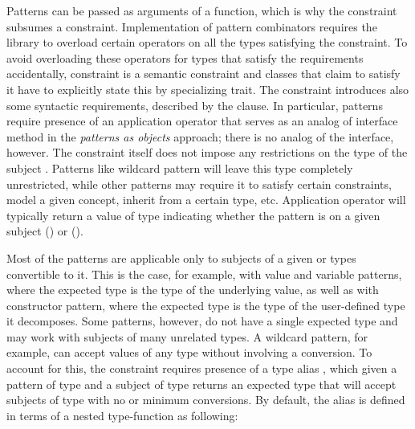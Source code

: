 Patterns can be passed as arguments of a function, which is why the constraint subsumes a
 constraint. Implementation of pattern combinators requires the 
library to overload certain operators on all the types satisfying the 
constraint. To avoid overloading these operators for types that satisfy the 
requirements accidentally,  constraint is a semantic constraint 
and classes that claim to satisfy it have to explicitly state this by specializing  
 trait. The constraint introduces also some syntactic 
requirements, described by the  clause. In particular, patterns 
require presence of an application operator that serves as an analog of 
 interface method in the \emph{patterns as 
objects} approach; there is no analog of the  interface, however. 
The  constraint itself does not impose any restrictions on the 
type of the subject . Patterns like wildcard pattern will leave this 
type completely unrestricted, while other patterns may require it to satisfy 
certain constraints, model a given concept, inherit from a certain type, etc.
Application operator will typically return a value of type  
indicating whether the pattern is  on a given subject 
() or  (). %

Most of the patterns are applicable only to subjects of a given  
or types convertible to it. This is the case, for example, with value and  
variable patterns, where the expected type is the type of the underlying value, 
as well as with constructor pattern, where the expected type is the type of the 
user-defined type it decomposes. Some patterns, however, do not have a single 
expected type and may work with subjects of many unrelated types. A wildcard 
pattern, for example, can accept values of any type without involving a 
conversion. To account for this, the  constraint requires presence of 
a type alias , which given a pattern of type  and 
a subject of type  returns an expected type  
that will accept subjects of type  with no or minimum conversions. 
By default, the alias is defined in terms of a nested type-function 
 as following:

